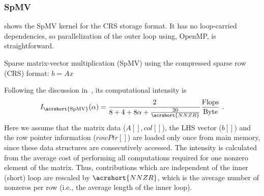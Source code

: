 \subsubsection{\acrshort{SpMV}}
 shows the \acrshort{SpMV} kernel for the \acrshort{CRS} storage format. It has no loop-carried dependencies, so parallelization of the outer loop using, \eg OpenMP, is straightforward. 
\begin{algorithm}[tbp]
	\caption{Sparse matrix-vector multiplication (\acrshort{SpMV}) using the compressed sparse row (\acrshort{CRS}) format: $b=A x$} 
	\label{alg:SpMV}
	\begin{algorithmic}[1]
			\ENDFOR
		\ENDFOR
	\end{algorithmic}
\end{algorithm}
Following the discussion in~\cite{Moritz_sell}, its computational intensity is
\begin{equation}
\label{eq:SpMV_intensity}
I_\mathrm{\acrshort{SpMV}} (\alpha)= \frac{2}{8+4+8\alpha+\frac{20}{\acrshort{NNZR}}} \frac{\FLOP}{\BYTE}\eos
\end{equation}
Here we assume that the matrix data  ($A[], col[]$), the LHS vector ($b[]$) and the row pointer information ($rowPtr[]$) are loaded only once from main memory, since these data structures are consecutively accessed. The intensity is calculated from the average cost of performing all computations required for one nonzero element of the matrix. Thus, contributions which are independent of the inner (short) loop are rescaled by $\acrshort{NNZR}$, which is the average number of nonzeros per row (i.e., the average length of the inner loop).


